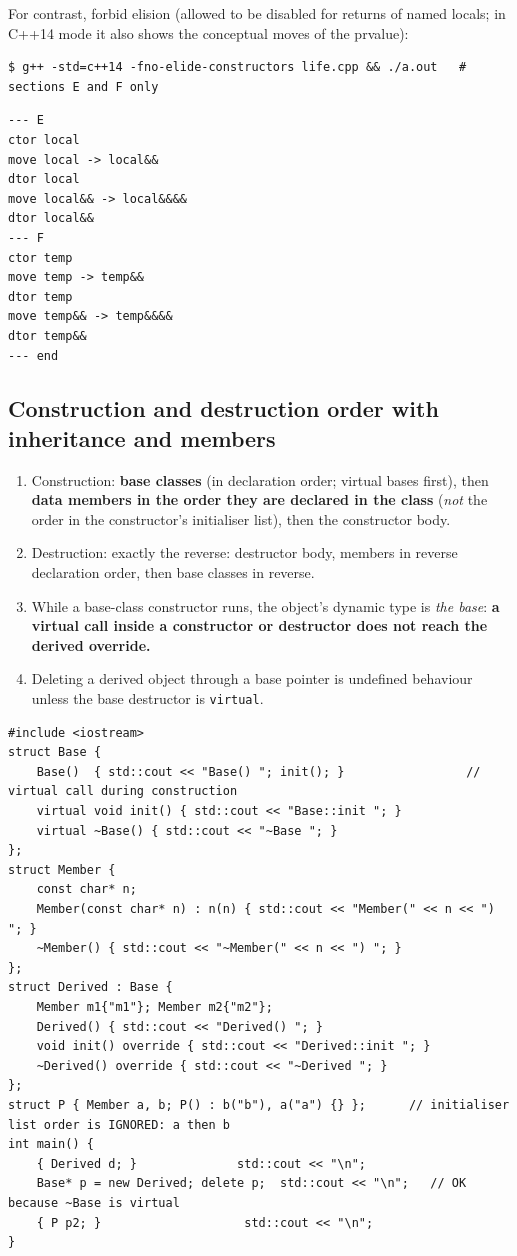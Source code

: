 \documentclass[10pt,a4paper,openany,oneside]{report}
\begin{document}
For contrast, forbid elision (allowed to be disabled for returns of named locals; in C++14 mode it also shows the conceptual moves of the prvalue):
\begin{lstlisting}[style=shcmd]
$ g++ -std=c++14 -fno-elide-constructors life.cpp && ./a.out   # sections E and F only
\end{lstlisting}
\begin{lstlisting}[style=out]
--- E
ctor local
move local -> local&&
dtor local
move local&& -> local&&&&
dtor local&&
--- F
ctor temp
move temp -> temp&&
dtor temp
move temp&& -> temp&&&&
dtor temp&&
--- end
\end{lstlisting}

\subsection{Construction and destruction order with inheritance and members}
\begin{mustbox}
\begin{enumerate}[nosep]
\item Construction: \textbf{base classes} (in declaration order; virtual bases first), then \textbf{data members in the order they are declared in the class} (\emph{not} the order in the constructor's initialiser list), then the constructor body.
\item Destruction: exactly the reverse: destructor body, members in reverse declaration order, then base classes in reverse.
\item While a base-class constructor runs, the object's dynamic type is \emph{the base}: \textbf{a virtual call inside a constructor or destructor does not reach the derived override.}
\item Deleting a derived object through a base pointer is undefined behaviour unless the base destructor is \texttt{virtual}.
\end{enumerate}
\end{mustbox}
\begin{lstlisting}[language={[11]C++},title={Order of construction/destruction; virtual call in a constructor}]
#include <iostream>
struct Base {
    Base()  { std::cout << "Base() "; init(); }                 // virtual call during construction
    virtual void init() { std::cout << "Base::init "; }
    virtual ~Base() { std::cout << "~Base "; }
};
struct Member {
    const char* n;
    Member(const char* n) : n(n) { std::cout << "Member(" << n << ") "; }
    ~Member() { std::cout << "~Member(" << n << ") "; }
};
struct Derived : Base {
    Member m1{"m1"}; Member m2{"m2"};
    Derived() { std::cout << "Derived() "; }
    void init() override { std::cout << "Derived::init "; }
    ~Derived() override { std::cout << "~Derived "; }
};
struct P { Member a, b; P() : b("b"), a("a") {} };      // initialiser list order is IGNORED: a then b
int main() {
    { Derived d; }              std::cout << "\n";
    Base* p = new Derived; delete p;  std::cout << "\n";   // OK because ~Base is virtual
    { P p2; }                    std::cout << "\n";
}
\end{lstlisting}
\end{document}

